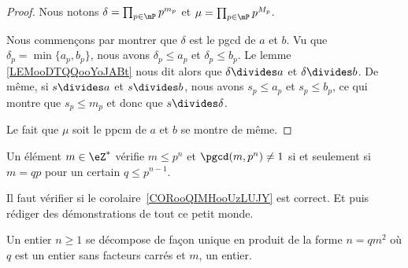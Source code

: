 \begin{proof}
    Nous notons $\delta=\prod_{p\in\mP}p^{m_p}$ et $\mu=\prod_{p\in\mP}p^{M_p}$. 
    
    Nous commençons par montrer que \( \delta\) est le pgcd de \( a\) et \( b\). Vu que \( \delta_p=\min\{ a_p,b_p \}\), nous avons \( \delta_p\leq a_p\) et \( \delta_p\leq b_p\). Le lemme \ref{LEMooDTQQooYoJABt} nous dit alors que \( \delta\divides a\) et \( \delta\divides b\). De même, si \(s\divides a\) et \( s\divides b\), nous avons \( s_p\leq a_p\) et \( s_p\leq b_p\), ce qui montre que \( s_p\leq m_p\) et donc que \( s\divides \delta\).

    Le fait que \( \mu\) soit le ppcm de \( a\) et \( b\) se montre de même.
\end{proof}

\begin{corollary}  \label{CORooQIMHooUzLUJY}
    Un élément \( m\in \eZ^*\) vérifie \( m\leq p^n\) et \( \pgcd(m,p^n)\neq 1\) si et seulement si \( m=qp\) pour un certain \( q\leq p^{n-1}\).
\end{corollary}

\begin{probleme}
   Il faut vérifier si le corolaire~\ref{CORooQIMHooUzLUJY} est correct.
   Et puis rédiger des démonstrations de tout ce petit monde.
\end{probleme}

\begin{lemma}   \label{LemheKdsa}
    Un entier \( n\geq 1\) se décompose de façon unique en produit de la forme \( n=qm^2\) où \( q\) est un entier sans facteurs carrés et \( m\), un entier.
\end{lemma}

